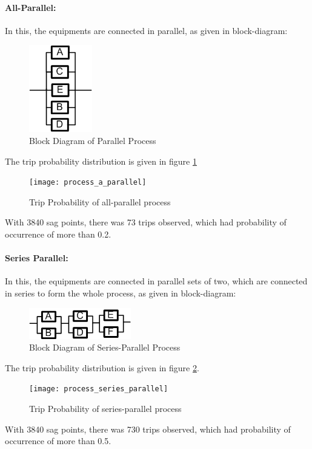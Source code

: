 \documentclass[17pt,a4paper]{extreport}
\begin{document}
\newpage \paragraph{ All-Parallel:} In this, the equipments are connected in parallel, as given in block-diagram:

\begin{figure}[!h]
\centering
\includegraphics[scale=1]{3.png}
\caption{Block Diagram of Parallel Process}
\end{figure}

The trip probability distribution is given in figure \ref{fig:all-parallel}


\begin{figure}[!h]
\texttt{[image: process\_a\_parallel]}
\caption{Trip Probability of all-parallel process}
\label{fig:all-parallel}
\end{figure}
With 3840 sag points, there was 73 trips observed, which had probability of occurrence of more than 0.2. 

\newpage \paragraph{ Series Parallel:} In this, the equipments are connected in parallel sets of two, which are connected in series to form the whole process, as given in block-diagram:

\begin{figure}[!h]
\centering
\includegraphics[scale=1]{2.png}
\caption{Block Diagram of Series-Parallel Process}
\end{figure}

The trip probability distribution is given in figure \ref{fig:series-parallel}.


\begin{figure}
\texttt{[image: process\_series\_parallel]}
\caption{Trip Probability of series-parallel process}
\label{fig:series-parallel}
\end{figure}
With 3840 sag points, there was 730 trips observed, which had probability of occurrence of more than 0.5. 
\end{document}
